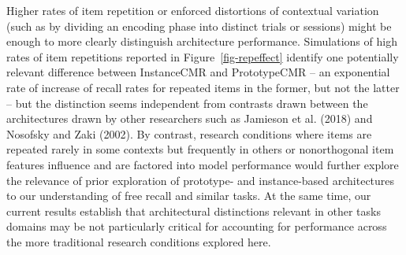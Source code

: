 \documentclass[
  letterpaper,
  DIV=11]{article}
\begin{document}
Higher rates of item repetition or enforced distortions of contextual
variation (such as by dividing an encoding phase into distinct trials or
sessions) might be enough to more clearly distinguish architecture
performance. Simulations of high rates of item repetitions reported in
Figure~\ref{fig-repeffect} identify one potentially relevant difference
between InstanceCMR and PrototypeCMR -- an exponential rate of increase
of recall rates for repeated items in the former, but not the latter --
but the distinction seems independent from contrasts drawn between the
architectures drawn by other researchers such as Jamieson et al. (2018)
and Nosofsky and Zaki (2002). By contrast, research conditions where
items are repeated rarely in some contexts but frequently in others or
nonorthogonal item features influence and are factored into model
performance would further explore the relevance of prior exploration of
prototype- and instance-based architectures to our understanding of free
recall and similar tasks. At the same time, our current results
establish that architectural distinctions relevant in other tasks
domains may be not particularly critical for accounting for performance
across the more traditional research conditions explored here.
\end{document}

